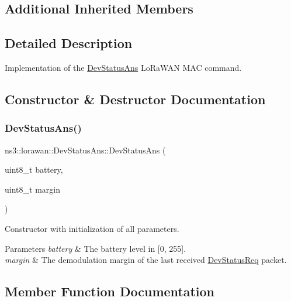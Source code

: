 \subsection*{Additional Inherited Members}


\subsection{Detailed Description}
Implementation of the \hyperlink{classns3_1_1lorawan_1_1DevStatusAns}{Dev\+Status\+Ans} Lo\+Ra\+W\+AN M\+AC command. 

\subsection{Constructor \& Destructor Documentation}
\mbox{\label{classns3_1_1lorawan_1_1DevStatusAns_a2a117f790856a52f98743c42aaab5097}} 
\subsubsection{\texorpdfstring{Dev\+Status\+Ans()}{DevStatusAns()}}
{\footnotesize\ttfamily ns3\+::lorawan\+::\+Dev\+Status\+Ans\+::\+Dev\+Status\+Ans (\begin{DoxyParamCaption}\item[{uint8\+\_\+t}]{battery,  }\item[{uint8\+\_\+t}]{margin }\end{DoxyParamCaption})}

Constructor with initialization of all parameters.


\begin{DoxyParams}{Parameters}
{\em battery} & The battery level in \mbox{[}0, 255\mbox{]}. \\
\hline
{\em margin} & The demodulation margin of the last received \hyperlink{classns3_1_1lorawan_1_1DevStatusReq}{Dev\+Status\+Req} packet. \\
\hline
\end{DoxyParams}


\subsection{Member Function Documentation}
\mbox{\label{classns3_1_1lorawan_1_1DevStatusAns_a359096eee9c97dd58abd5b37f2bcd059}} 
